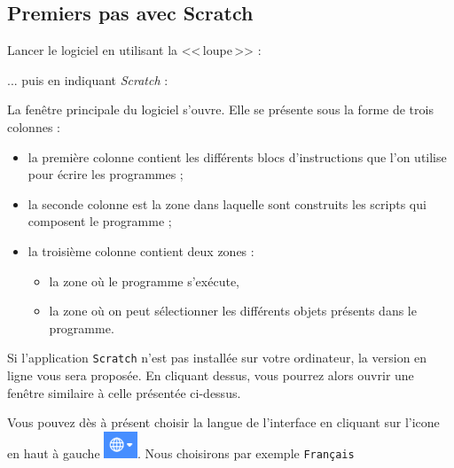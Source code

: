 \subsection{Premiers pas avec Scratch}

Lancer le logiciel en utilisant la <<\,loupe\,>> :


... puis en indiquant \emph{Scratch} :



La fenêtre principale du logiciel s'ouvre. Elle se présente sous la forme de trois colonnes :

\begin{itemize}
\item la première colonne  contient les différents blocs d'instructions que l'on utilise pour écrire les programmes ;
\item la seconde colonne  est la zone dans laquelle sont construits les scripts qui composent le programme ;
\item la troisième colonne  contient deux zones :
        \begin{itemize}
        \item la zone où le programme s'exécute,
        \item la zone où on peut sélectionner les différents objets présents dans le programme.
        \end{itemize}
\end{itemize}


Si l'application \texttt{Scratch} n'est pas installée sur votre ordinateur, la version en ligne vous sera proposée. En cliquant dessus, vous pourrez alors ouvrir une fenêtre similaire à celle présentée ci-dessus.

Vous pouvez dès à présent choisir la langue de l'interface en cliquant sur l'icone en haut à gauche  \includegraphics[width=1cm]{./images/scratch/changerLangue.png}. Nous choisirons par exemple \texttt{Français}





